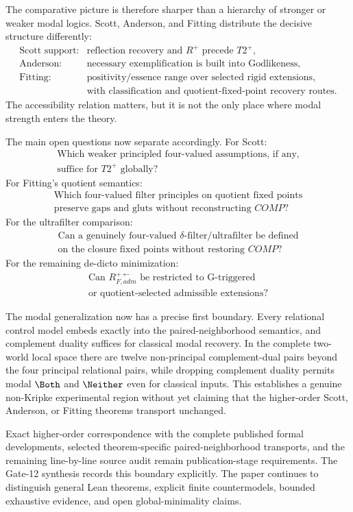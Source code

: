 The comparative picture is therefore sharper than a hierarchy of stronger or weaker modal logics. Scott, Anderson, and Fitting distribute the decisive structure differently:
\[
\begin{array}{ll}
\text{Scott support:} & \text{reflection recovery and }R^+\text{ precede }T2^+,\\
\text{Anderson:} & \text{necessary exemplification is built into Godlikeness},\\
\text{Fitting:} & \text{positivity/essence range over selected rigid extensions,}\\
& \text{with classification and quotient-fixed-point recovery routes.}
\end{array}
\]
The accessibility relation matters, but it is not the only place where modal strength enters the theory.

The main open questions now separate accordingly. For Scott:
\[
  \boxed{
  \begin{gathered}
  \text{Which weaker principled four-valued assumptions, if any,}\\
  \text{suffice for }T2^+\text{ globally?}
  \end{gathered}
  }
\]
For Fitting's quotient semantics:
\[
  \boxed{
  \begin{gathered}
  \text{Which four-valued filter principles on quotient fixed points}\\
  \text{preserve gaps and gluts without reconstructing }COMP\text{?}
  \end{gathered}
  }
\]
For the ultrafilter comparison:
\[
  \boxed{
  \begin{gathered}
  \text{Can a genuinely four-valued }\delta\text{-filter/ultrafilter be defined}\\
  \text{on the closure fixed points without restoring }COMP\text{?}
  \end{gathered}
  }
\]
For the remaining de-dicto minimization:
\[
  \boxed{
  \begin{gathered}
  \text{Can }R_{F,adm}^{+\leftarrow}\text{ be restricted to G-triggered}\\
  \text{or quotient-selected admissible extensions?}
  \end{gathered}
  }
\]

The modal generalization now has a precise first boundary. Every relational control model embeds exactly into the paired-neighborhood semantics, and complement duality suffices for classical modal recovery. In the complete two-world local space there are twelve non-principal complement-dual pairs beyond the four principal relational pairs, while dropping complement duality permits modal \(\Both\) and \(\Neither\) even for classical inputs. This establishes a genuine non-Kripke experimental region without yet claiming that the higher-order Scott, Anderson, or Fitting theorems transport unchanged.

Exact higher-order correspondence with the complete published formal developments, selected theorem-specific paired-neighborhood transports, and the remaining line-by-line source audit remain publication-stage requirements. The Gate-12 synthesis records this boundary explicitly. The paper continues to distinguish general Lean theorems, explicit finite countermodels, bounded exhaustive evidence, and open global-minimality claims.
